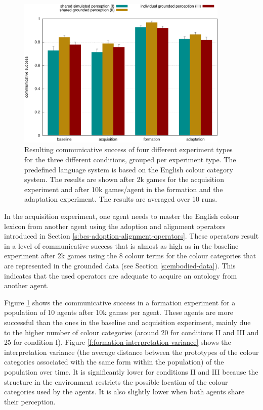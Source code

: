 \begin{figure}[htbp]
\begin{center}
\includegraphics[width=0.9\textwidth]{./experiments/figures/grounding-comparison-communicative-success.pdf}
\caption[Communicative success in three different conditions for four
types of experiments]{Resulting communicative success of four
  different experiment types for the three different conditions,
  grouped per experiment type. The predefined language system is based
  on the English colour category system. The results are shown after
  2k games for the acquisition experiment and after 10k games/agent in
  the formation and the adaptation experiment. The results are
  averaged over 10 runs.}
\label{f:comparison-communicative-success}
\end{center}
\end{figure}

In the acquisition experiment, one agent needs to master the English
colour lexicon from another agent using the adoption and alignment
operators introduced in Section
\ref{s:bcs-adoption-alignment-operators}. These operators result in a
level of communicative success that is almost as high as in the
baseline experiment after 2k games using the 8 colour terms for the
colour categories that are represented in the grounded data (see
Section \ref{s:embodied-data}). This indicates that the used operators
are adequate to acquire an ontology from another agent.

Figure \ref{f:comparison-communicative-success} shows the
communicative success in a formation experiment for a population of 10
agents after 10k games per agent. These agents are more successful
than the ones in the baseline and acquisition experiment, mainly due
to the higher number of colour categories (around 20 for conditions II
and III and 25 for condition I). Figure
\ref{f:formation-interpretation-variance} shows the interpretation
variance (the average distance between the prototypes of the colour
categories associated with the same form within the population) of the
population over time. It is significantly lower for conditions II and
III because the structure in the environment restricts the possible
location of the colour categories used by the agents. It is also
slightly lower when both agents share their perception.

